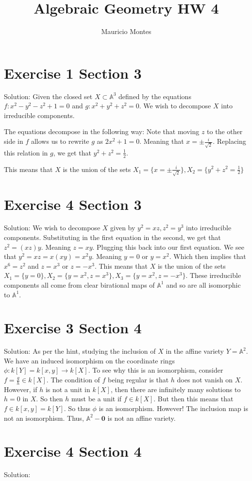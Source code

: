 \documentclass{article}
\title{Algebraic Geometry HW 4}
\author{Mauricio Montes}
\begin{document}
\maketitle

\section*{Exercise 1 Section 3 }

Solution: Given the closed set $X \subset \mathbb{A}^3$ defined by the equations
$f: x^2 - y^2 - z^2 + 1= 0$ and $g: x^2 + y^2 + z^2 = 0$. We wish to decompose $X$ into irreducible components.

The equations decompose in the following way: Note that moving $z$ to the other side in $f$ allows us to rewrite $g$ as
$2x^2 + 1 = 0$. Meaning that $x = \pm \frac{i}{\sqrt{2}}$. Replacing this relation in $g$, we get that $y^2 + z^2 = \frac{1}{2}$.

This means that $X$ is the union of the sets $X_1 = \{x = \pm \frac{i}{\sqrt{2}} \}, X_2 = \{y^2 + z^2 = \frac{1}{2}\}$



\section*{Exercise 4 Section 3}


Solution: We wish to decompose $X$ given by $y^2 = xz, z^2 = y^3$ into irreducible components. Substituting in 
the first equation in the second, we get that $z^2 = (xz)y$. Meaning $z = xy$. Plugging this back into our first
equation. We see that $y^2 = xz = x(xy) = x^2y$. Meaning $y = 0$ or $y = x^2$. Which then implies that $x^6 = z^2$ and 
$z = x^3$ or $z = -x^3$. This means that $X$ is the union of the sets 
$X_1 = \{y = 0\}, X_2 = \{y = x^2, z = x^3\}, X_3 = \{y = x^2, z = -x^3\}$. These irreducible components all come from clear
birational maps of $\mathbb{A}^1$ and so are all isomorphic to $\mathbb{A}^1$.

\section*{Exercise 3 Section 4}

Solution: As per the hint, studying the inclusion of $X$ in the affine variety $Y = \mathbb{A}^2$.
We have an induced isomorphism on the coordinate rings $\phi: k[Y]= k[x,y] \rightarrow k[X]$. To see why this is an isomorphism,
consider $f = \frac{g}{h} \in k[X]$. The condition of $f$ being regular is that $h$ does not vanish on $X$. However, if $h$ is not
a unit in $k[X]$, then there are infinitely many solutions to $h = 0$ in $X$. So then $h$ must be a unit if $f \in k[X]$.
But then this means that $f \in k[x,y] = k[Y]$. So thus $\phi$ is an isomorphism. However! The inclusion map is not an isomorphism.
Thus, $\mathbb{A}^2 - \mathbf{0}$ is not an affine variety.

\section*{Exercise 4 Section 4}

Solution: 
\end{document}
